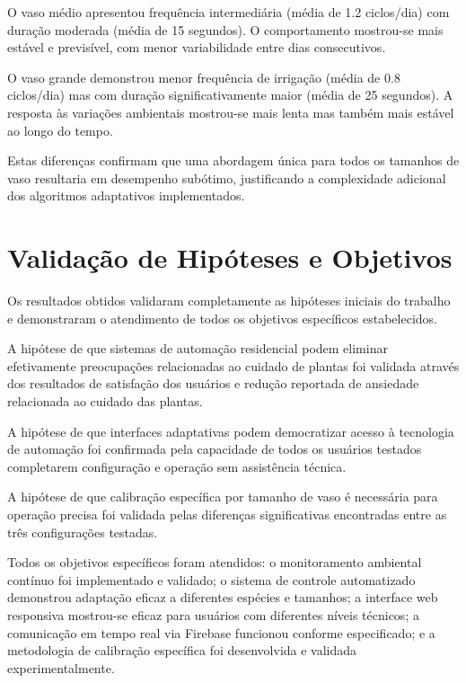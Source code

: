 \documentclass[twoside,english,brazilian]{UNISINOSmonografia}
\begin{document}
O vaso médio apresentou frequência intermediária (média de 1.2 ciclos/dia) com duração moderada (média de 15 segundos). O comportamento mostrou-se mais estável e previsível, com menor variabilidade entre dias consecutivos.

O vaso grande demonstrou menor frequência de irrigação (média de 0.8 ciclos/dia) mas com duração significativamente maior (média de 25 segundos). A resposta às variações ambientais mostrou-se mais lenta mas também mais estável ao longo do tempo.

Estas diferenças confirmam que uma abordagem única para todos os tamanhos de vaso resultaria em desempenho subótimo, justificando a complexidade adicional dos algoritmos adaptativos implementados.

\section{Validação de Hipóteses e Objetivos}

Os resultados obtidos validaram completamente as hipóteses iniciais do trabalho e demonstraram o atendimento de todos os objetivos específicos estabelecidos.

A hipótese de que sistemas de automação residencial podem eliminar efetivamente preocupações relacionadas ao cuidado de plantas foi validada através dos resultados de satisfação dos usuários e redução reportada de ansiedade relacionada ao cuidado das plantas.

A hipótese de que interfaces adaptativas podem democratizar acesso à tecnologia de automação foi confirmada pela capacidade de todos os usuários testados completarem configuração e operação sem assistência técnica.

A hipótese de que calibração específica por tamanho de vaso é necessária para operação precisa foi validada pelas diferenças significativas encontradas entre as três configurações testadas.

Todos os objetivos específicos foram atendidos: o monitoramento ambiental contínuo foi implementado e validado; o sistema de controle automatizado demonstrou adaptação eficaz a diferentes espécies e tamanhos; a interface web responsiva mostrou-se eficaz para usuários com diferentes níveis técnicos; a comunicação em tempo real via Firebase funcionou conforme especificado; e a metodologia de calibração específica foi desenvolvida e validada experimentalmente.

\end{document}
